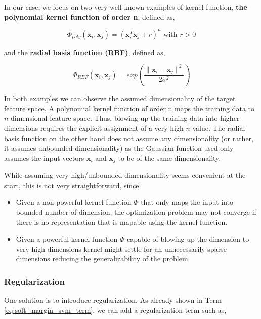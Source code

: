 \documentclass[pdftex,12pt,a4paper]{report}
\begin{document}
In our case, we focus on two very well-known examples of kernel function, \textbf{the polynomial kernel function of order n}, defined as,

\begin{equation}
\Phi_{poly}(\mathbf{x}_i, \mathbf{x}_j) = \left(\mathbf{x}_i^T \mathbf{x}_j + r \right)^n \text{ with } r > 0
\label{eq:svm_quad}
\end{equation} 

and the \textbf{radial basis function (RBF)}, defined as,

\begin{equation}
\Phi_{RBF}(\mathbf{x}_i, \mathbf{x}_j) = exp\left(\frac{\| \mathbf{x}_i - \mathbf{x}_j \|^2}{2 \sigma^2}\right)
\label{eq:svm_rbf}
\end{equation}

In both examples we can observe the assumed dimensionality of the target feature space. A polynomial kernel function of order n maps the training data to $n$-dimensional feature  space. Thus, blowing up the training data into higher dimensions requires the explicit assignment of a very high $n$ value. The  radial basis function on the other hand does not assume any dimensionality (or rather, it assumes unbounded dimensionality) as the Gaussian function used only assumes the input vectors $\mathbf{x}_i$ and $\mathbf{x}_j$ to be of the same dimensionality. 

While assuming very high/unbounded dimensionality seems convenient at the start, this is not very straightforward, since:

\begin{itemize}
\item Given a non-powerful kernel function $\Phi$ that only maps the input into bounded number of dimension, the optimization problem may not converge if there is no representation that is mapable  using the kernel function.
\item Given a powerful kernel function $\Phi$ capable of blowing up the dimension to very high dimensions kernel might settle for an unnecessarily sparse dimensions reducing the generalizability of the problem.
\end{itemize}

\subsubsection*{Regularization}

One solution is to introduce regularization. As already shown in Term \ref{eq:soft_margin_svm_term}, we can add a regularization term such as, 
\end{document}
